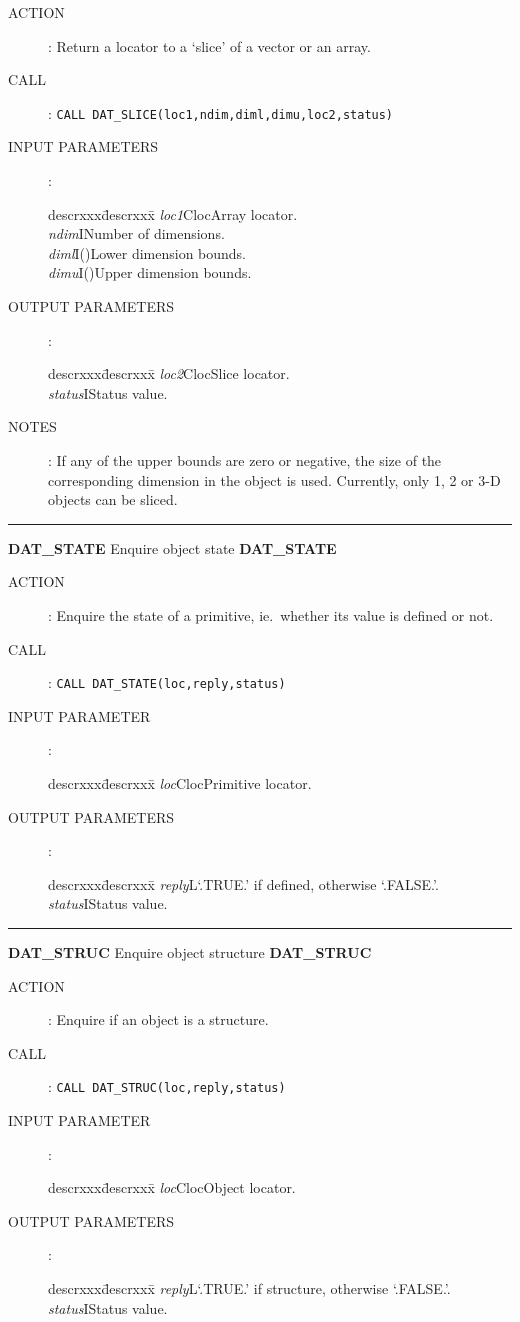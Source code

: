 \begin{description}
\item [ACTION]:
Return a locator to a `slice' of a vector or an array.
\item [CALL]:
{\tt CALL DAT\_SLICE(loc1,ndim,diml,dimu,loc2,status)}
\item [INPUT PARAMETERS]:
\begin{tabbing}
descrxxx\=descrxxx\=\kill
{\em loc1}\>Cloc\>Array locator.\\
{\em ndim}\>I\>Number of dimensions.\\
{\em diml}\>I()\>Lower dimension bounds.\\
{\em dimu}\>I()\>Upper dimension bounds.
\end{tabbing}
\item [OUTPUT PARAMETERS]:
\begin{tabbing}
descrxxx\=descrxxx\=\kill
{\em loc2}\>Cloc\>Slice locator.\\
{\em status}\>I\>Status value.
\end{tabbing}
\item [NOTES]:
If any of the upper bounds are zero or negative, the size of the corresponding
dimension in the object is used.
Currently, only 1, 2 or 3-D objects can be sliced.
\end{description}
\goodbreak
\rule{\textwidth}{0.3mm}
{\Large {\bf DAT\_STATE} \hfill Enquire object state \hfill {\bf DAT\_STATE}}
\begin{description}
\item [ACTION]:
Enquire the state of a primitive, ie.\ whether its value is defined or not.
\item [CALL]:
{\tt CALL DAT\_STATE(loc,reply,status)}
\item [INPUT PARAMETER]:
\begin{tabbing}
descrxxx\=descrxxx\=\kill
{\em loc}\>Cloc\>Primitive locator.
\end{tabbing}
\item [OUTPUT PARAMETERS]:
\begin{tabbing}
descrxxx\=descrxxx\=\kill
{\em reply}\>L\>`.TRUE.' if defined, otherwise `.FALSE.'.\\
{\em status}\>I\>Status value.
\end{tabbing}
\end{description}
\goodbreak
\rule{\textwidth}{0.3mm}
{\Large {\bf DAT\_STRUC} \hfill Enquire object structure \hfill {\bf DAT\_STRUC}}
\begin{description}
\item [ACTION]:
Enquire if an object is a structure.
\item [CALL]:
{\tt CALL DAT\_STRUC(loc,reply,status)}
\item [INPUT PARAMETER]:
\begin{tabbing}
descrxxx\=descrxxx\=\kill
{\em loc}\>Cloc\>Object locator.
\end{tabbing}
\item [OUTPUT PARAMETERS]:
\begin{tabbing}
descrxxx\=descrxxx\=\kill
{\em reply}\>L\>`.TRUE.' if structure, otherwise `.FALSE.'.\\
{\em status}\>I\>Status value.
\end{tabbing}
\end{description}
